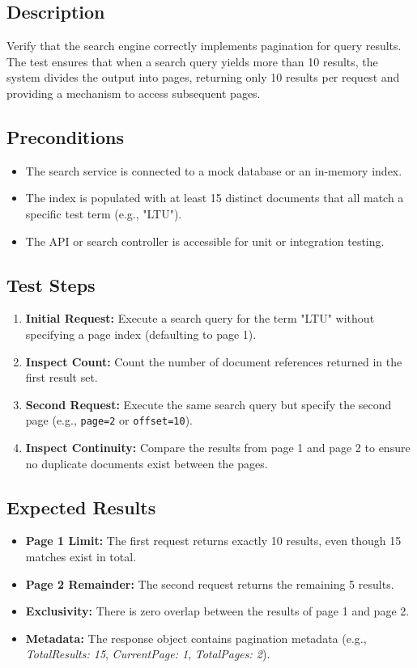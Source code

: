 \documentclass{article}
\begin{document}
\subsection*{Description}
Verify that the search engine correctly implements pagination for query results. The test ensures that 
when a search query yields more than 10 results, the system divides the output into pages, returning only 
10 results per request and providing a mechanism to access subsequent pages.

\subsection*{Preconditions}
\begin{itemize}
  \item The search service is connected to a mock database or an in-memory index.
  \item The index is populated with at least 15 distinct documents that all match a specific test term (e.g., "LTU").
  \item The API or search controller is accessible for unit or integration testing.
\end{itemize}

\subsection*{Test Steps}
\begin{enumerate}
  \item \textbf{Initial Request:} Execute a search query for the term "LTU" without specifying a page index (defaulting to page 1).
  \item \textbf{Inspect Count:} Count the number of document references returned in the first result set.
  \item \textbf{Second Request:} Execute the same search query but specify the second page (e.g., \texttt{page=2} or \texttt{offset=10}).
  \item \textbf{Inspect Continuity:} Compare the results from page 1 and page 2 to ensure no duplicate documents exist between the pages.
\end{enumerate}

\subsection*{Expected Results}
\begin{itemize}
  \item \textbf{Page 1 Limit:} The first request returns exactly 10 results, even though 15 matches exist in total.
  \item \textbf{Page 2 Remainder:} The second request returns the remaining 5 results.
  \item \textbf{Exclusivity:} There is zero overlap between the results of page 1 and page 2.
  \item \textbf{Metadata:} The response object contains pagination metadata (e.g., \textit{TotalResults: 15}, \textit{CurrentPage: 1}, \textit{TotalPages: 2}).
\end{itemize}
\end{document}
